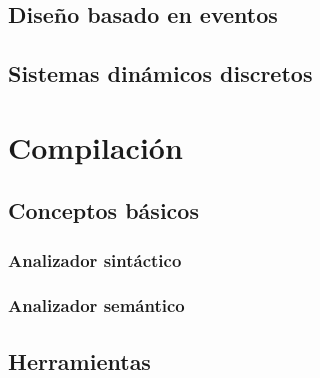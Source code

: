 \subsection{Diseño basado en eventos}

\subsection{Sistemas dinámicos discretos}

\section{Compilación}\label{sec:compilacion}



\subsection{Conceptos básicos}


\subsubsection{Analizador sintáctico}

\subsubsection{Analizador semántico}

\subsection{Herramientas}
